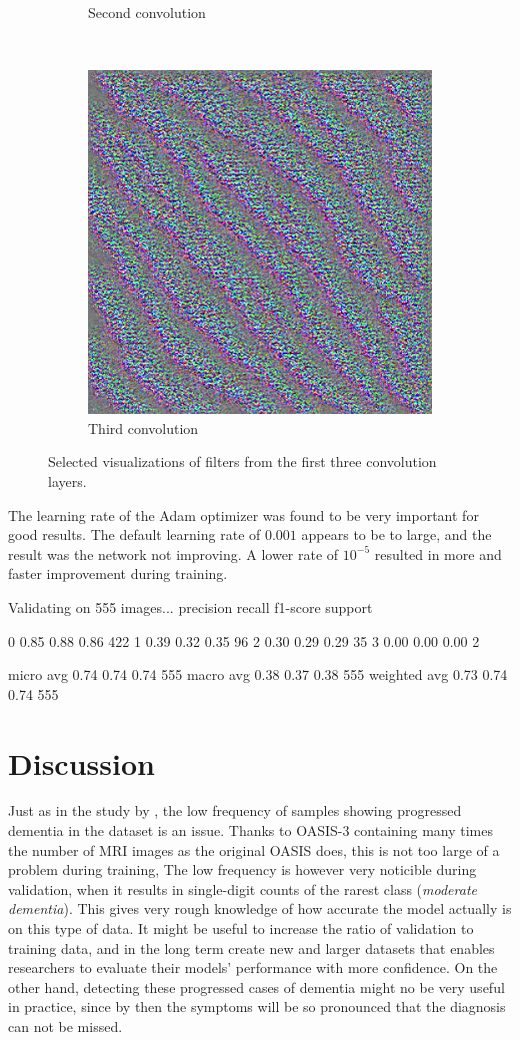 \documentclass{kththesis}
\begin{document}
\begin{figure}
\begin{subfigure}{.5\textwidth}
    \caption{Second convolution}
    \label{fig:layer1}
  \end{subfigure}
  \\[10pt]
  \begin{subfigure}{1\textwidth}
    \centering
    \includegraphics[width=0.45\linewidth]{img/layer2.png}
    \caption{Third convolution}
    \label{fig:layer1}
  \end{subfigure}
  \caption{Selected visualizations of filters from the first three convolution layers.}
  \label{fig:filtervis}
\end{figure}

The learning rate of the Adam optimizer was found to be very important for good results. The default learning rate of $0.001$ appears to be to large, and the result was the network not improving. A lower rate of $10^{-5}$ resulted in more and faster improvement during training.


Validating on 555 images...
              precision    recall  f1-score   support

           0       0.85      0.88      0.86       422
           1       0.39      0.32      0.35        96
           2       0.30      0.29      0.29        35
           3       0.00      0.00      0.00         2

   micro avg       0.74      0.74      0.74       555
   macro avg       0.38      0.37      0.38       555
weighted avg       0.73      0.74      0.74       555

\chapter{Discussion}
Just as in the study by \textcite{islam2018early}, the low frequency of samples showing progressed dementia in the dataset is an issue. Thanks to OASIS-3 containing many times the number of MRI images as the original OASIS does, this is not too large of a problem during training, The low frequency is however very noticible during validation, when it results in single-digit counts of the rarest class (\textit{moderate dementia}). This gives very rough knowledge of how accurate the model actually is on this type of data. It might be useful to increase the ratio of validation to training data, and in the long term create new and larger datasets that enables researchers to evaluate their models' performance with more confidence. On the other hand, detecting these progressed cases of dementia might no be very useful in practice, since by then the symptoms will be so pronounced that the diagnosis can not be missed.
\end{document}
